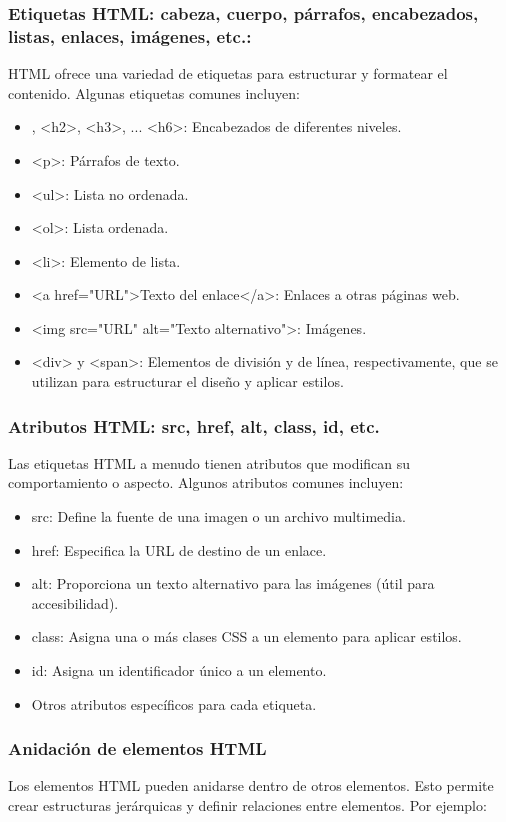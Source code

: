 \documentclass[executivepaper]{article}
\begin{document}
\subsubsection*{Etiquetas HTML: cabeza, cuerpo, párrafos, encabezados, listas, enlaces, imágenes, etc.:}
HTML ofrece una variedad de etiquetas para estructurar y formatear el contenido. Algunas etiquetas comunes incluyen:
\begin{itemize}
  \item <h1>, <h2>, <h3>, ... <h6>: Encabezados de diferentes niveles.
  \item <p>: Párrafos de texto.
  \item <ul>: Lista no ordenada.
  \item <ol>: Lista ordenada.
  \item <li>: Elemento de lista.
  \item <a href="URL">Texto del enlace</a>: Enlaces a otras páginas web.
  \item <img src="URL" alt="Texto alternativo">: Imágenes.
  \item <div> y <span>: Elementos de división y de línea, respectivamente, que se utilizan para estructurar el diseño y aplicar estilos.
\end{itemize}

\subsubsection*{Atributos HTML: src, href, alt, class, id, etc.}
Las etiquetas HTML a menudo tienen atributos que modifican su comportamiento o aspecto. Algunos atributos comunes incluyen:
\begin{itemize}
  \item src: Define la fuente de una imagen o un archivo multimedia.
  \item href: Especifica la URL de destino de un enlace.
  \item alt: Proporciona un texto alternativo para las imágenes (útil para accesibilidad).
  \item class: Asigna una o más clases CSS a un elemento para aplicar estilos.
  \item id: Asigna un identificador único a un elemento.
  \item Otros atributos específicos para cada etiqueta.
\end{itemize}

\subsubsection*{Anidación de elementos HTML}
Los elementos HTML pueden anidarse dentro de otros elementos. Esto permite crear estructuras jerárquicas y definir relaciones entre elementos. Por ejemplo:
\end{document}
